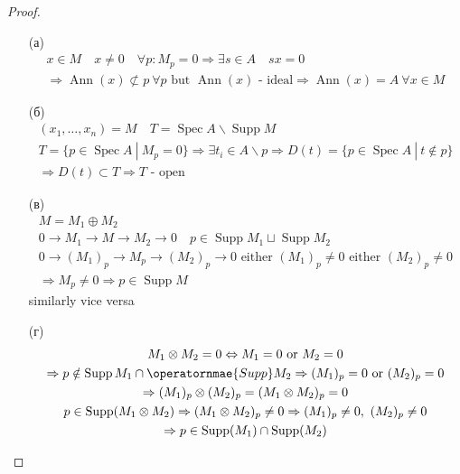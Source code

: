 \begin{proof}
\begin{itemize}
\item[]
\item[(а)] 
	\begin{gather*}
		x \in M\quad x \neq 0\quad \forall p: M_p = 0
		\Rightarrow \exists s \in A\quad sx = 0\\
		\Rightarrow \operatorname{Ann}(x) \not\subset p\ \forall p \text{ but } \operatorname{Ann}(x) \text{ - ideal}
		\Rightarrow \operatorname{Ann}(x) = A\ \forall x \in M
	\end{gather*}
\item[(б)] 
	\begin{gather*}
		(x_1, \ldots, x_n) = M\quad T = \operatorname{Spec} A \backslash \operatorname{Supp} M\\
		T = \{p \in \operatorname{Spec}A\ |\ M_p = 0\}
		\Rightarrow \exists t_i \in A \backslash p
		\Rightarrow D(t) = \{p \in \operatorname{Spec} A\ |\ t \notin p\}\\
		\Rightarrow D(t) \subset T
		\Rightarrow T \text{ - open}
	\end{gather*}
\item[(в)]
	\begin{gather*}
		M = M_1 \oplus M_2\\
		0 \to M_1 \to M \to M_2 \to 0\quad p \in \operatorname{Supp} M_1 \sqcup \operatorname{Supp} M_2\\
		0 \to (M_1)_p \to M_p \to (M_2)_p \to 0 \text{ either } (M_1)_p \neq 0 \text{ either } (M_2)_p \neq 0\\
		\Rightarrow M_p \neq 0
		\Rightarrow p \in \operatorname{Supp} M 
	\end{gather*}
	similarly vice versa
\item[(г)]
	\begin{gather*}
		M_1 \otimes M_2 = 0 \Leftrightarrow M_1 = 0 \text{ or } M_2 = 0\\
		\Rightarrow p \notin \operatorname{Supp} M_1 \cap \operatornmae{Supp} M_2 \Rightarrow (M_1)_p = 0 \text{ or } (M_2)_p = 0\\
		\Rightarrow (M_1)_p \otimes (M_2)_p = (M_1 \otimes M_2)_p = 0\\
		p \in \operatorname{Supp}(M_1 \otimes M_2)
		\Rightarrow (M_1 \otimes M_2)_p \neq 0
		\Rightarrow (M_1)_p \neq 0,\ (M_2)_p \neq 0\\
		\Rightarrow p \in \operatorname{Supp}(M_1) \cap \operatorname{Supp}(M_2)
	\end{gather*}
\end{itemize}
\end{proof}
\begin{comment}
https://math.stackexchange.com/questions/1101681/tensor-product-of-two-finitely-generated-modules
https://math.stackexchange.com/questions/3225239/tensor-product-of-modules-finitely-generated
http://www.nou.ac.in/Online%
\end{comment}
\vskip 0.6in






